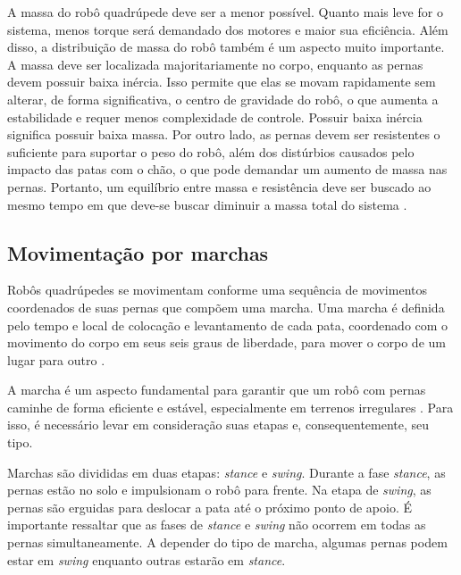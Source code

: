 \documentclass[../main.tex]{subfiles}
\begin{document}
A massa do robô quadrúpede deve ser a menor possível. Quanto mais leve for o sistema, menos torque será demandado dos motores e maior sua eficiência. Além disso, a distribuição de massa do robô também é um aspecto muito importante. A massa deve ser localizada majoritariamente no corpo, enquanto as pernas devem possuir baixa inércia. Isso permite que elas se movam rapidamente sem alterar, de forma significativa, o centro de gravidade do robô, o que aumenta a estabilidade e requer menos complexidade de controle. Possuir baixa inércia significa possuir baixa massa. Por outro lado, as pernas devem ser resistentes o suficiente para suportar o peso do robô, além dos distúrbios causados pelo impacto das patas com o chão, o que pode demandar um aumento de massa nas pernas. Portanto, um equilíbrio entre massa e resistência deve ser buscado ao mesmo tempo em que deve-se buscar diminuir a massa total do sistema \cite{Zhong2019}.

\subsection{Movimentação por marchas}
Robôs quadrúpedes se movimentam conforme uma sequência de movimentos coordenados de suas pernas que compõem uma marcha. Uma marcha é definida pelo tempo e local de colocação e levantamento de cada pata, coordenado com o movimento do corpo em seus seis graus de liberdade, para mover o corpo de um lugar para outro  \cite{Song1989}.

A marcha é um aspecto fundamental para garantir que um robô com pernas caminhe de forma eficiente e estável, especialmente em terrenos irregulares \cite{X.129}. Para isso, é necessário levar em consideração suas etapas e, consequentemente, seu tipo.

Marchas são divididas em duas etapas: \textit{stance} e \textit{swing}. Durante a fase \textit{stance}, as pernas estão no solo e impulsionam o robô para frente. Na etapa de \textit{swing}, as pernas são erguidas para deslocar a pata até o próximo ponto de apoio. É importante ressaltar que as fases de \textit{stance} e \textit{swing} não ocorrem em todas as pernas simultaneamente. A depender do tipo de marcha, algumas pernas podem estar em \textit{swing} enquanto outras estarão em \textit{stance}.
\end{document}
